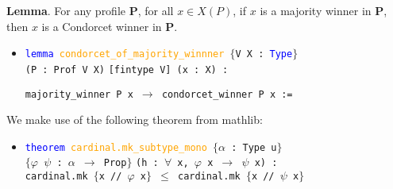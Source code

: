 \documentclass[12pt,xcolor=svgnames,blue,aspectratio=169]{beamer}
\begin{document}
\begin{frame}

{\bf Lemma}. For any profile  $\mathbf{P}$, for all $x\in X(P)$, if $x$ is a majority winner in $\mathbf{P}$, then $x$ is a Condorcet winner  in $\mathbf{P}$. 

\vfill 
\begin{itemize}
\item[] \texttt{\textcolor{blue}{lemma} \textcolor{orange}{condorcet\_of\_majority\_winnner} $\{$V X : \textcolor{blue}{Type}$\}$\\ (P : Prof V X)}
\texttt{[fintype V] (x : X) :}

 \texttt{majority\_winner P x $\to$ condorcet\_winner P x :=}

\end{itemize}


\end{frame}


\begin{frame}

We make use of the following theorem from mathlib: 

\bigskip

\begin{itemize}
\item[] \texttt{\textcolor{blue}{theorem} \textcolor{orange}{cardinal.mk\_subtype\_mono} $\{$$\alpha$ : Type u$\}$\\ $\{$$\varphi$ $\psi$ : $\alpha$ $\to$ Prop$\}$} 
\texttt{(h : $\forall$ x, $\varphi$ x $\to$ $\psi$ x) :} \\\texttt{cardinal.mk $\{$x // $\varphi$ x$\}$ $\leq$ cardinal.mk $\{$x // $\psi$ x$\}$}
\end{itemize}
\end{frame}
\end{document}
